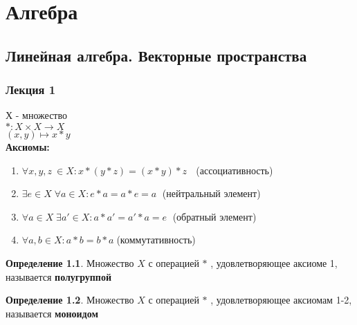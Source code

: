 \documentclass[12pt]{report}
\begin{document}
\renewcommand{\proofname}{Доказательство}

\theoremstyle{plain}
\newtheorem{thm}{Теорема}[section]
\newtheorem*{lm}{Лемма}
\newtheorem*{st}{Утверждение}
\newtheorem*{prop}{Свойства}

\theoremstyle{definition}
\newtheorem{defn}{Определение}
\newtheorem*{ex}{Пример}
\newtheorem*{exs}{Примеры}
\newtheorem*{cor}{Следствие}
\newtheorem*{name}{Обозначение}

\theoremstyle{remark}
\newtheorem*{rem}{Ремарка}
\newtheorem*{note}{Замечание}
\newtheorem*{probl}{Упражнение}

\newcommand{\Z}{\mathbb{Z}}
\newcommand{\N}{\mathbb{N}}
\newcommand{\R}{\mathbb{R}}
\newcommand{\Q}{\mathbb{Q}}
\newcommand{\K}{\mathbb{K}}
\newcommand{\Cm}{\mathbb{C}}
\newcommand{\Pm}{\mathbb{P}}
\newcommand{\ilim}{\int\limits}
\newcommand{\slim}{\sum\limits}


\part{Алгебра}
\chapter{Линейная алгебра. Векторные пространства}
\section{Лекция 1}
Х - множество\\
$ *: X \times X \to X$\\
$ (x, y) \mapsto x * y$\\
{\bf Аксиомы:}
\begin{enumerate}
    \item $\forall x,y,z \: \in X: x*(y*z) = (x*y)*z$ $\;$ (ассоциативность)
    \item $\exists e \in X \; \forall a \in X: e*a = a*e = a \;$ (нейтральный элемент)
    \item $\forall a \in X \; \exists a' \in X: a*a' = a' * a = e \;$ (обратный элемент)
    \item $\forall a, b \in X: a * b = b * a \; $(коммутативность)
\end{enumerate}

\begin{defn}
Множество $X$ с операцией $*$ , удовлетворяющее  аксиоме 1, называется {\bf полугруппой}
\end{defn}

\begin{defn}
Множество $X$ с операцией $*$ , удовлетворяющее  аксиомам 1-2, называется {\bf моноидом}
\end{defn}
\end{document}
